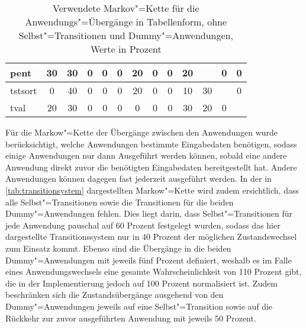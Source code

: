 \begin{table}
\begin{tabular}{|l|c|c|c|c|c|c|c|c|c|c|c|c|}
    	\acs{pent}    &     30      &    30     &     0      &      0      &    0     &    20    &     0      &      0      &    20    &            &       0       &     0      \\ \hline
    	\acs{tstsort} &      0      &    40     &     0      &      0      &    0     &    20    &     0      &      0      &    10    &     30     &               &     0      \\ \hline
    	\acs{tval}    &     20      &    30     &     0      &      0      &    0     &    0     &     0      &      0      &    30    &     20     &       0       &            \\ \hline
    \end{tabular}
    \caption[Verwendete Markov"=Kette für die Anwendungs"=Übergänge in Tabellenform]{Verwendete Markov"=Kette für die Anwendungs"=Übergänge in Tabellenform, ohne Selbst"=Transitionen und Dummy"=Anwendungen, Werte in Prozent}
    \label{tab:transitionsystem}
\end{table}

Für die Markow"=Kette der Übergänge zwischen den Anwendungen wurde berücksichtigt, welche Anwendungen bestimmte Eingabedaten benötigen, sodass einige Anwendungen nur dann Ausgeführt werden können, sobald eine andere Anwendung direkt zuvor die benötigten Eingabedaten bereitgestellt hat. Andere Anwendungen können dagegen fast jederzeit ausgeführt werden. In der in \autoref{tab:transitionsystem} dargestellten Markow"=Kette wird zudem ersichtlich, dass alle Selbst"=Transitionen sowie die Transitionen für die beiden Dummy"=Anwendungen fehlen. Dies liegt darin, dass Selbst"=Transitionen für jede Anwendung pauschal auf 60 Prozent festgelegt wurden, sodass das hier dargestellte Transitionssystem nur in 40 Prozent der möglichen Zustandswechsel zum Einsatz kommt. Ebenso sind die Übergänge in die beiden Dummy"=Anwendungen mit jeweils fünf Prozent definiert, weshalb es im Falle eines Anwendungswechsels eine gesamte Wahrscheinlichkeit von 110 Prozent gibt, die in der Implementierung jedoch auf 100 Prozent normalisiert ist. Zudem beschränken sich die Zustandsübergänge ausgehend von den Dummy"=Anwendungen jeweils auf eine Selbst"=Transition sowie auf die Rückkehr zur zuvor ausgeführten Anwendung mit jeweils 50 Prozent.